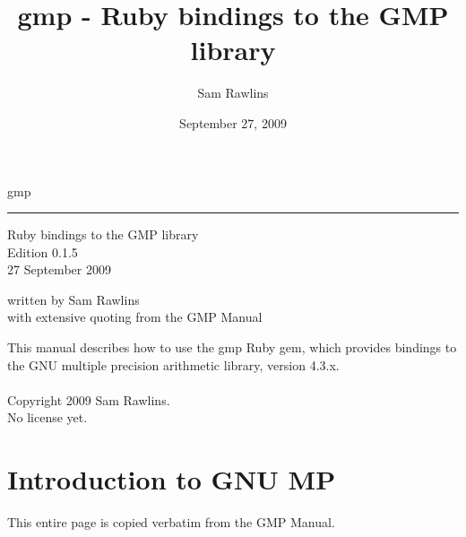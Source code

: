 \documentclass[pdftex,10pt]{article}
\title{gmp - Ruby bindings to the GMP library}
\date{September 27, 2009}
\author{Sam Rawlins}
\newcommand{\HRule}{\rule{\linewidth}{0.8mm}}
\begin{document}
\huge{gmp}\\
\HRule
\begin{flushright}
\large{Ruby bindings to the GMP library}\\
\large{Edition 0.1.5}\\
\large{27 September 2009}\\
\end{flushright}
\vfill
\large{written by Sam Rawlins}\\
\large{with extensive quoting from the GMP Manual}
\newpage

\vfill
This manual describes how to use the gmp Ruby gem, which provides bindings to
the GNU multiple precision arithmetic library, version 4.3.x.\\
\\
Copyright 2009 Sam Rawlins.\\
No license yet.
\newpage

\tableofcontents
\newpage

\section{Introduction to GNU MP}

This entire page is copied verbatim from the GMP Manual.\\\\
\end{document}
